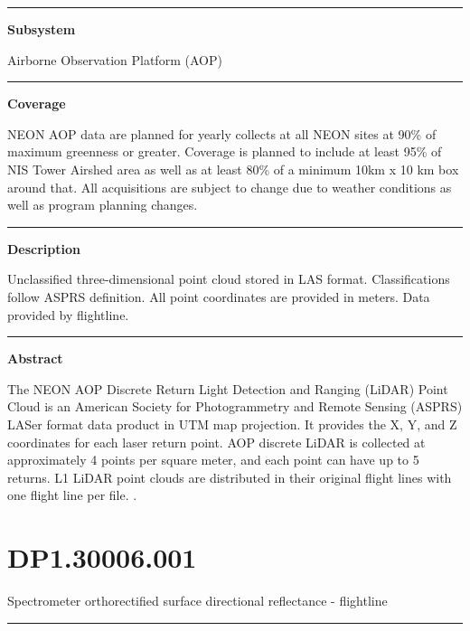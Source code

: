 \documentclass[]{article}
\begin{document}
\begin{center}\rule{0.5\linewidth}{\linethickness}\end{center}

\textbf{Subsystem}

Airborne Observation Platform (AOP)

\begin{center}\rule{0.5\linewidth}{\linethickness}\end{center}

\textbf{Coverage}

NEON AOP data are planned for yearly collects at all NEON sites at 90\%
of maximum greenness or greater. Coverage is planned to include at least
95\% of NIS Tower Airshed area as well as at least 80\% of a minimum
10km x 10 km box around that. All acquisitions are subject to change due
to weather conditions as well as program planning changes.

\begin{center}\rule{0.5\linewidth}{\linethickness}\end{center}

\textbf{Description}

Unclassified three-dimensional point cloud stored in LAS format.
Classifications follow ASPRS definition. All point coordinates are
provided in meters. Data provided by flightline.

\begin{center}\rule{0.5\linewidth}{\linethickness}\end{center}

\textbf{Abstract}

The NEON AOP Discrete Return Light Detection and Ranging (LiDAR) Point
Cloud is an American Society for Photogrammetry and Remote Sensing
(ASPRS) LASer format data product in UTM map projection. It provides the
X, Y, and Z coordinates for each laser return point. AOP discrete LiDAR
is collected at approximately 4 points per square meter, and each point
can have up to 5 returns. L1 LiDAR point clouds are distributed in their
original flight lines with one flight line per file. \newpage
.

\section{DP1.30006.001}\label{dp1.30006.001}

Spectrometer orthorectified surface directional reflectance - flightline

\begin{center}\rule{0.5\linewidth}{\linethickness}\end{center}
\end{document}
